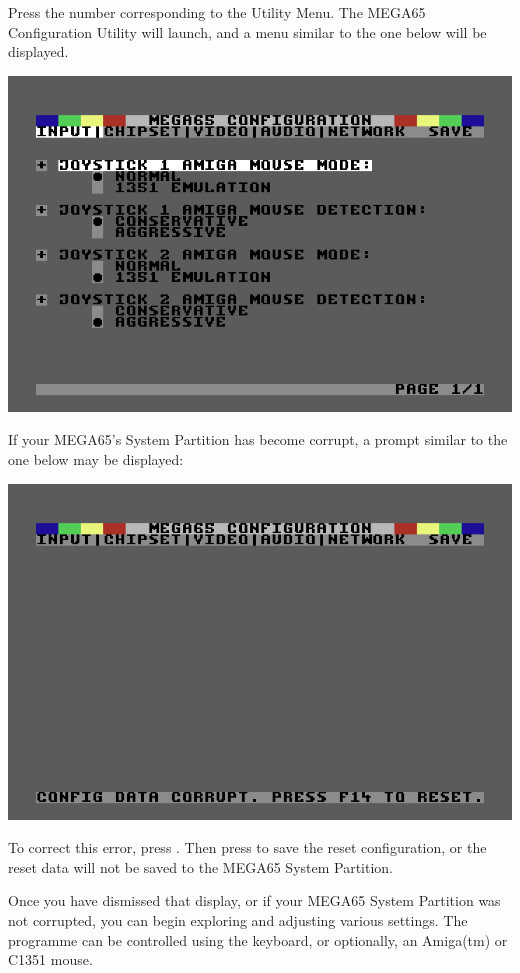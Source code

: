 Press the number corresponding to the Utility Menu. The MEGA65 Configuration Utility will launch, and a menu similar to the one below will be displayed.

\includegraphics[width=\linewidth]{images/ss-m65config-1.png}

If your MEGA65's System Partition has become corrupt, a prompt similar to the one below may be displayed:

\includegraphics[width=\linewidth]{images/ss-m65config-corrupt.png}

To correct this error, press . Then press  to save the reset configuration, or the reset data will not be saved to the MEGA65 System
Partition.

Once you have dismissed that display, or if your MEGA65 System Partition was not corrupted, you can begin exploring and adjusting various settings. The programme can be controlled using the keyboard, or optionally, an Amiga(tm) or C1351 mouse.

